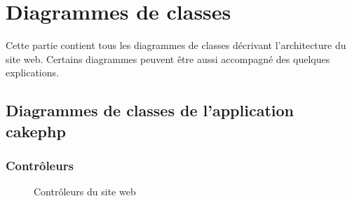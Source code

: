 \chapter{Diagrammes de classes}

Cette partie contient tous les diagrammes de classes décrivant l'architecture du site web. Certains diagrammes peuvent être aussi accompagné des quelques explications.

\newpage

\section{Diagrammes de classes de l'application cakephp}

\subsection{Contrôleurs}

\begin{figure}[H]
	
		\begin{center}\end{center}
		\caption{Contrôleurs du site web}

\end{figure}
